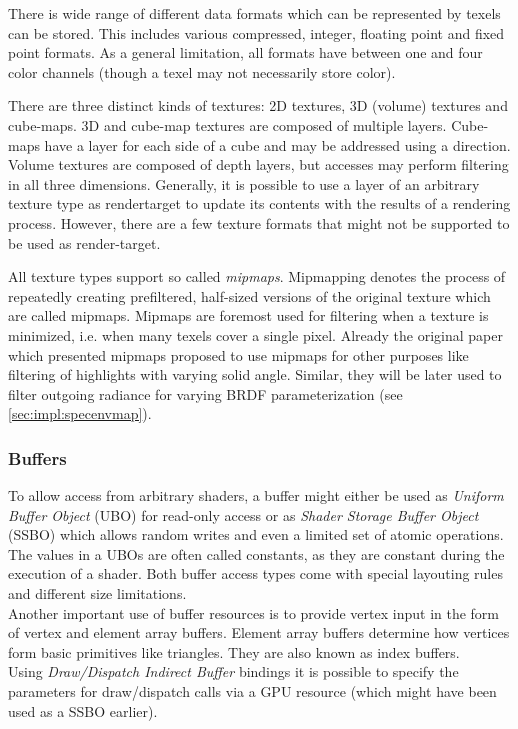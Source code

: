 \documentclass[thesis.tex]{subfiles}
\begin{document}
There is wide range of different data formats which can be represented by texels can be stored.
This includes various compressed, integer, floating point and fixed point formats.
As a general limitation, all formats have between one and four color channels (though a texel may not necessarily store color).

There are three distinct kinds of textures: 2D textures, 3D (volume) textures and cube-maps.
3D and cube-map textures are composed of multiple layers.
Cube-maps have a layer for each side of a cube and may be addressed using a direction.
Volume textures are composed of depth layers, but accesses may perform filtering in all three dimensions.
Generally, it is possible to use a layer of an arbitrary texture type as rendertarget to update its contents with the results of a rendering process.
However, there are a few texture formats that might not be supported to be used as render-target.

All texture types support so called \emph{mipmaps}.
Mipmapping denotes the process of repeatedly creating prefiltered, half-sized versions of the original texture which are called mipmaps.
Mipmaps are foremost used for filtering when a texture is minimized, i.e. when many texels cover a single pixel.
Already the original paper \cite{bib:mipmap} which presented mipmaps proposed to use mipmaps for other purposes like filtering of highlights with varying solid angle.
Similar, they will be later used to filter outgoing radiance for varying BRDF parameterization (see \autoref{sec:impl:specenvmap}).

\subsubsection{Buffers}
To allow access from arbitrary shaders, a buffer might either be used as \emph{Uniform Buffer Object} (UBO) for read-only access or as \emph{Shader Storage Buffer Object} (SSBO) which allows random writes and even a limited set of atomic operations.
The values in a UBOs are often called constants, as they are constant during the execution of a shader.
Both buffer access types come with special layouting rules and different size limitations.
\\
Another important use of buffer resources is to provide vertex input in the form of vertex and element array buffers.
Element array buffers determine how vertices form basic primitives like triangles. 
They are also known as index buffers.
\\
Using \emph{Draw/Dispatch Indirect Buffer} bindings it is possible to specify the parameters for draw/dispatch calls via a GPU resource (which might have been used as a SSBO earlier).
\end{document}
